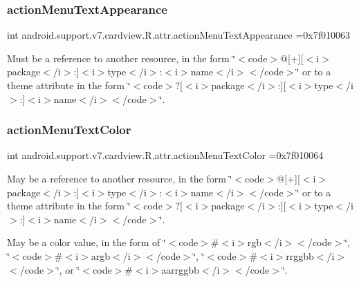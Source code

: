 \subsubsection{\texorpdfstring{action\+Menu\+Text\+Appearance}{actionMenuTextAppearance}}
{\footnotesize\ttfamily int android.\+support.\+v7.\+cardview.\+R.\+attr.\+action\+Menu\+Text\+Appearance =0x7f010063\hspace{0.3cm}{\ttfamily [static]}}

Must be a reference to another resource, in the form \char`\"{}$<$code$>$@\mbox{[}+\mbox{]}\mbox{[}$<$i$>$package$<$/i$>$\+:\mbox{]}$<$i$>$type$<$/i$>$\+:$<$i$>$name$<$/i$>$$<$/code$>$\char`\"{} or to a theme attribute in the form \char`\"{}$<$code$>$?\mbox{[}$<$i$>$package$<$/i$>$\+:\mbox{]}\mbox{[}$<$i$>$type$<$/i$>$\+:\mbox{]}$<$i$>$name$<$/i$>$$<$/code$>$\char`\"{}. \mbox{\label{classandroid_1_1support_1_1v7_1_1cardview_1_1R_1_1attr_a0da5374357f02b6aaa09e3c863ee36dc}} 
\subsubsection{\texorpdfstring{action\+Menu\+Text\+Color}{actionMenuTextColor}}
{\footnotesize\ttfamily int android.\+support.\+v7.\+cardview.\+R.\+attr.\+action\+Menu\+Text\+Color =0x7f010064\hspace{0.3cm}{\ttfamily [static]}}

May be a reference to another resource, in the form \char`\"{}$<$code$>$@\mbox{[}+\mbox{]}\mbox{[}$<$i$>$package$<$/i$>$\+:\mbox{]}$<$i$>$type$<$/i$>$\+:$<$i$>$name$<$/i$>$$<$/code$>$\char`\"{} or to a theme attribute in the form \char`\"{}$<$code$>$?\mbox{[}$<$i$>$package$<$/i$>$\+:\mbox{]}\mbox{[}$<$i$>$type$<$/i$>$\+:\mbox{]}$<$i$>$name$<$/i$>$$<$/code$>$\char`\"{}. 

May be a color value, in the form of \char`\"{}$<$code$>$\#$<$i$>$rgb$<$/i$>$$<$/code$>$\char`\"{}, \char`\"{}$<$code$>$\#$<$i$>$argb$<$/i$>$$<$/code$>$\char`\"{}, \char`\"{}$<$code$>$\#$<$i$>$rrggbb$<$/i$>$$<$/code$>$\char`\"{}, or \char`\"{}$<$code$>$\#$<$i$>$aarrggbb$<$/i$>$$<$/code$>$\char`\"{}. \mbox{\label{classandroid_1_1support_1_1v7_1_1cardview_1_1R_1_1attr_a79984b1b7a19fe268b558f520a308f19}} 

